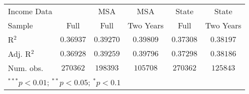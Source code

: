 \begin{tabular}{l c c c c c}
Income Data          &                  & MSA              & MSA              & State            & State            \\
Sample               & Full             & Full             & Two Years        & Full             & Two Years        \\
R$^2$                & $0.36937$        & $0.39270$        & $0.39809$        & $0.37308$        & $0.38197$        \\
Adj. R$^2$           & $0.36928$        & $0.39259$        & $0.39796$        & $0.37298$        & $0.38186$        \\
Num. obs.            & $270362$         & $198393$         & $105708$         & $270362$         & $125843$         \\
\hline
\multicolumn{6}{l}{\scriptsize{$^{***}p<0.01$; $^{**}p<0.05$; $^{*}p<0.1$}}
\end{tabular}
